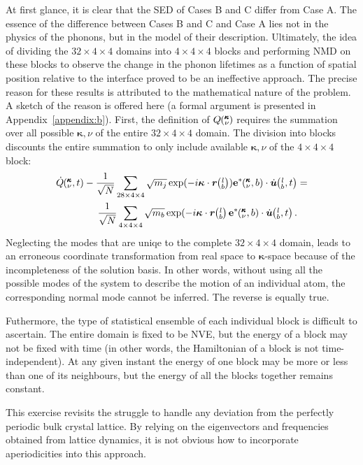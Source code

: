 At first glance, it is clear that the SED of Cases B and C differ from Case A. The essence of the difference between Cases B and C and Case A lies not in the physics of the phonons, but in the model of their description. Ultimately, the idea of dividing the $32\times4\times4$ domains into $4\times4\times4$ blocks and performing NMD on these blocks to observe the change in the phonon lifetimes as a function of spatial position relative to the interface proved to be an ineffective approach.
The precise reason for these results is attributed to the mathematical nature of the problem. A sketch of the reason is offered here (a formal argument is presented in Appendix~\ref{appendix:b}). First, the definition of $Q \mspace{-4.0mu}\left(\mspace{-8.0mu} \begin{smallmatrix}&\pmb{\kappa} \\&\nu\end{smallmatrix} \mspace{-3.0mu}\right) $ requires the summation over all possible $\bm{\kappa},\nu$ of the entire $32\times4\times4$ domain. The division into blocks discounts the entire summation to only include available $\bm{\kappa},\nu$ of the $4\times4\times4$ block:
\begin{eqnarray}
\begin{split}
\dot{Q}\kvt-\frac{1}{\sqrt{N}}\sum_{28\times4\times4}\sqrt{m_j}\exp(-i\bm{\kappa}\cdot\bm{r}\lb)\bm{\mathrm{e}}^*\kvb\cdot\dot{\bm{u}}\lbt&=\\\frac{1}{\sqrt{N}}\sum_{4\times4\times4}\sqrt{m_b}\exp(-i\bm{\kappa}\cdot\bm{r}\lb \bm{\mathrm{e}}^*\kvb\cdot\dot{\bm{u}}\lbt.
\end{split}
\end{eqnarray}
Neglecting the modes that are uniqe to the complete $32\times4\times4$ domain, leads to an erroneous coordinate transformation from real space to $\pmb{\kappa}$-space because of the incompleteness of the solution basis. In other words, without using all the possible modes of the system to describe the motion of an individual atom, the corresponding normal mode cannot be inferred. The reverse is equally true.

Futhermore, the type of statistical ensemble of each individual block is difficult to ascertain. The entire domain is fixed to be NVE, but the energy of a block may not be fixed with time (in other words, the Hamiltonian of a block is not time-independent). At any given instant the energy of one block may be more or less than one of its neighbours, but the energy of all the blocks together remains constant.

This exercise revisits the struggle to handle any deviation from the perfectly periodic bulk crystal lattice. By relying on the eigenvectors and frequencies obtained from lattice dynamics, it is not obvious how to incorporate aperiodicities into this approach.


